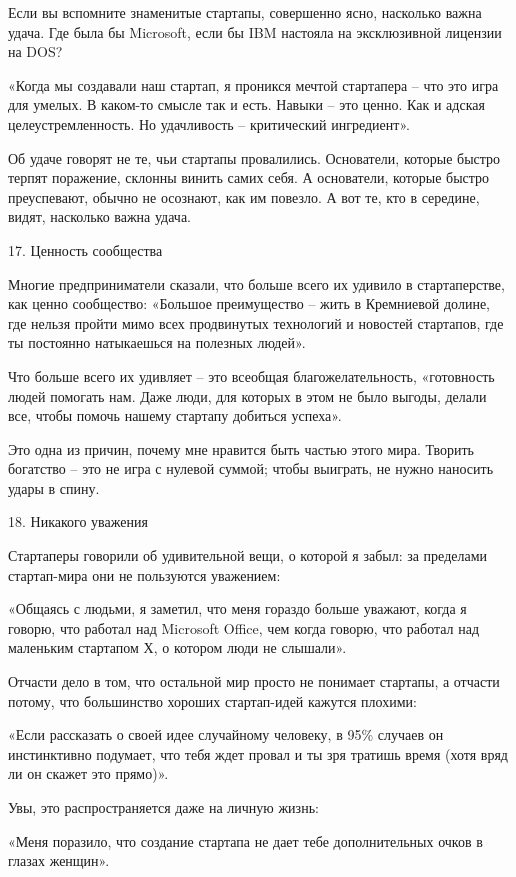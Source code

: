 \documentclass[ebook,12pt,oneside,openany]{memoir}
\begin{document}
Если вы вспомните знаменитые стартапы, совершенно ясно, насколько
важна удача. Где была бы Microsoft, если бы IBM настояла на
эксклюзивной лицензии на DOS?

«Когда мы создавали наш стартап, я проникся мечтой стартапера – что
это игра для умелых. В каком-то смысле так и есть. Навыки – это ценно.
Как и адская целеустремленность. Но удачливость – критический
ингредиент».

Об удаче говорят не те, чьи стартапы провалились. Основатели, которые
быстро терпят поражение, склонны винить самих себя. А основатели,
которые быстро преуспевают, обычно не осознают, как им повезло. А вот
те, кто в середине, видят, насколько важна удача.

17. Ценность сообщества

Многие предприниматели сказали, что больше всего их удивило в
стартаперстве, как ценно сообщество: «Большое преимущество – жить в
Кремниевой долине, где нельзя пройти мимо всех продвинутых технологий
и новостей стартапов, где ты постоянно натыкаешься на полезных людей».

Что больше всего их удивляет – это всеобщая благожелательность,
«готовность людей помогать нам. Даже люди, для которых в этом не было
выгоды, делали все, чтобы помочь нашему стартапу добиться успеха».

Это одна из причин, почему мне нравится быть частью этого мира.
Творить богатство – это не игра с нулевой суммой; чтобы выиграть, не
нужно наносить удары в спину.

18. Никакого уважения

Стартаперы говорили об удивительной вещи, о которой я забыл: за
пределами стартап-мира они не пользуются уважением:

«Общаясь с людьми, я заметил, что меня гораздо больше уважают, когда я
говорю, что работал над Microsoft Office, чем когда говорю, что
работал над маленьким стартапом Х, о котором люди не слышали».

Отчасти дело в том, что остальной мир просто не понимает стартапы, а
отчасти потому, что большинство хороших стартап-идей кажутся плохими:

«Если рассказать о своей идее случайному человеку, в 95\% случаев он
инстинктивно подумает, что тебя ждет провал и ты зря тратишь время
(хотя вряд ли он скажет это прямо)».

Увы, это распространяется даже на личную жизнь:

«Меня поразило, что создание стартапа не дает тебе дополнительных
очков в глазах женщин».
\end{document}
